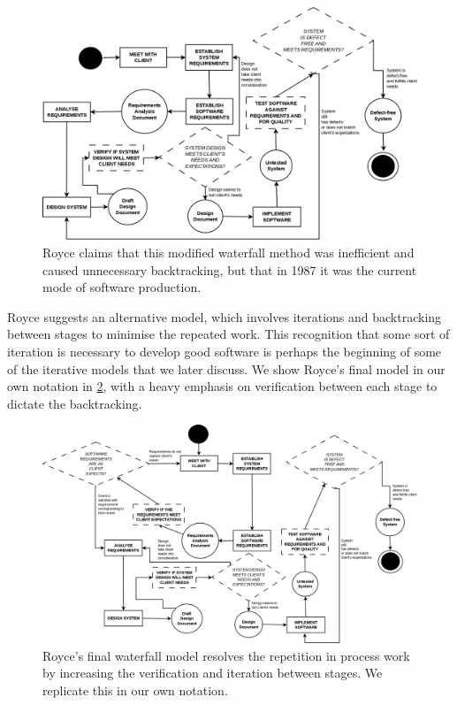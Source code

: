 \begin{figure}[ht!]
	\centering
	\includegraphics[scale=0.3]{media/WaterfallRoyceTwo}
	\caption{Royce claims that this modified waterfall method was inefficient and caused unnecessary
		backtracking, but that in 1987 it was the current mode of software production.}
	\label{waterfallRoyceTwo}
\end{figure}

Royce suggests an alternative model, which involves iterations and backtracking between stages to
minimise the repeated work.
This recognition that some sort of iteration is necessary to develop good software is perhaps the
beginning of some of the iterative models that we later discuss.
We show Royce's final model in our own notation in \ref{waterfallRoyceThree}, with a heavy emphasis
on verification between each stage to dictate the backtracking.

\pagebreak

\begin{figure}
	\centering
	\includegraphics[angle=90,scale=0.3]{media/WaterfallRoyceThree}
	\caption{Royce's final waterfall model resolves the repetition in process work by increasing the
		verification and iteration between stages. We replicate this in our own notation.}
	\label{waterfallRoyceThree}
\end{figure}

